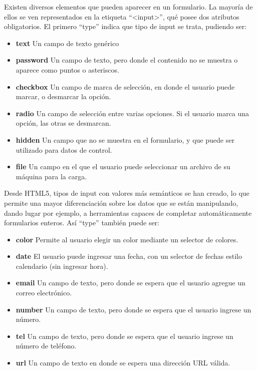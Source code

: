 Existen diversos elementos que pueden aparecer en un formulario. La mayoría de
ellos se ven representados en la etiqueta ``<input>'', qué posee dos atributos
obligatorios. El primero ``type'' indica que tipo de input se trata, pudiendo ser:
\begin{itemize}
  \item \textbf{text} Un campo de texto genérico
  \item \textbf{password} Un campo de texto, pero donde el contenido no se muestra
    o aparece como puntos o asteriscos.
  \item \textbf{checkbox} Un campo de marca de selección, en donde el usuario
    puede marcar, o desmarcar la opción.
  \item \textbf{radio} Un campo de selección entre varias opciones. Si el usuario
    marca una opción, las otras se desmarcan.
  \item \textbf{hidden} Un campo que no se muestra en el formulario, y que puede
    ser utilizado para datos de control.
  \item \textbf{file} Un campo en el que el usuario puede seleccionar un archivo
    de su máquina para la carga.
\end{itemize}

Desde HTML5, tipos de input con valores más semánticos se han creado, lo que
permite una mayor diferenciación sobre los datos que se están manipulando,
dando lugar por ejemplo, a herramientas capaces de completar automáticamente
formularios enteros. Así ``type'' también puede ser:

\begin{itemize}
  \item \textbf{color} Permite al usuario elegir un color mediante un selector
    de colores.
  \item \textbf{date} El usuario puede ingresar una fecha, con un selector de
    fechas estilo calendario (sin ingresar hora).
  \item \textbf{email} Un campo de texto, pero donde se espera que el usuario
    agregue un correo electrónico.
  \item \textbf{number} Un campo de texto, pero donde se espera que el usuario
    ingrese un número.
  \item \textbf{tel} Un campo de texto, pero donde se espera que el usuario
    ingrese un número de teléfono.
  \item \textbf{url} Un campo de texto en donde se espera una dirección URL válida.
\end{itemize}

